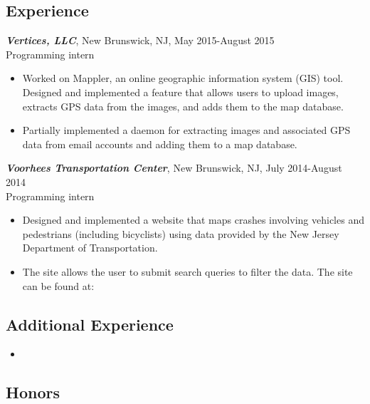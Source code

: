 \documentclass[12pt]{article}
\begin{document}
\subsection*{Experience}

\textit{\textbf{Vertices, LLC}}, New Brunswick, NJ, May 2015-August 2015 \\
Programming intern
\begin{itemize}
\item
Worked on Mappler, an online geographic information system (GIS) tool. Designed and implemented a feature that allows users to upload images, extracts GPS data from the images, and adds them to the map database.
\item
Partially implemented a daemon for extracting images and associated GPS data from email accounts and adding them to a map database.
\end{itemize}

\textit{\textbf{Voorhees Transportation Center}}, New Brunswick, NJ, July 2014-August 2014 \\
Programming intern
\begin{itemize}
\item
Designed and implemented a website that maps crashes involving vehicles and pedestrians (including bicyclists) using data provided by the New Jersey Department of Transportation.
\item
The site allows the user to submit search queries to filter the data. The site can be found at:

\end{itemize}

\subsection*{Additional Experience}

\begin{itemize}
\item
\end{itemize}

\subsection*{Honors}
\end{document}
